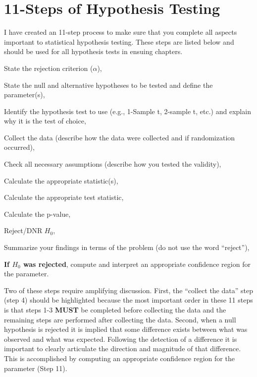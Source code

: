 \documentclass[10pt,openany]{book}\usepackage[]{graphicx}\usepackage[]{color}
\begin{document}
\minitoc
\newpage

\section{11-Steps of Hypothesis Testing}  \label{sec:11Steps}
I have created an 11-step process to make sure that you complete all aspects important to statistical hypothesis testing.  These steps are listed below and should be used for all hypothesis tests in ensuing chapters.
\begin{Enumerate}
  \item State the rejection criterion ($\alpha$),
  \item State the null and alternative hypotheses to be tested and define the parameter(s),
  \item Identify the hypothesis test to use (e.g., 1-Sample t, 2-sample t, etc.) and explain why it is the test of choice,
  \item Collect the data (describe how the data were collected and if randomization occurred),
  \item Check all necessary assumptions (describe how you tested the validity),
  \item Calculate the appropriate statistic(s),
  \item Calculate the appropriate test statistic,
  \item Calculate the p-value,
  \item Reject/DNR $H_{0}$,
  \item Summarize your findings in terms of the problem (do not use the word ``reject''),
  \item \textbf{If $H_{0}$ was rejected}, compute and interpret an appropriate confidence region for the parameter.
\end{Enumerate}

Two of these steps require amplifying discussion.  First, the ``collect the data'' step (step 4) should be highlighted because the most important order in these 11 steps is that steps 1-3 \textbf{MUST} be completed before collecting the data and the remaining steps are performed after collecting the data.  Second, when a null hypothesis is rejected it is implied that some difference exists between what was observed and what was expected.  Following the detection of a difference it is important to clearly articulate the direction and magnitude of that difference.  This is accomplished by computing an appropriate confidence region for the parameter (Step 11).
\end{document}
